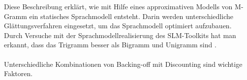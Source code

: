 Diese Beschreibung erkl\"art, wie mit Hilfe eines approximativen Modells von M-Gramm ein statisches Sprachmodell entsteht. Darin werden unterschiedliche Gl\"attungsverfahren eingesetzt, um das Sprachmodell optimiert aufzubauen.
Durch Versuche mit der Sprachmodellrealisierung des SLM-Toolkits hat man erkannt, dass das Trigramm besser als Bigramm und Unigramm sind .
\\
\\
Unterschiedliche Kombinationen von Backing-off mit Discounting sind wichtige Faktoren.

